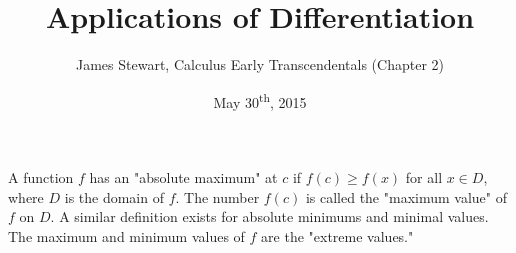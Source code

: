 \documentclass[a4paper,11pt]{article}
\title{Applications of Differentiation}
\author{James Stewart, Calculus Early Transcendentals (Chapter 2)}
\date{May 30\textsuperscript{th}, 2015}
\begin{document}
\maketitle
{}

\begin{outline}

    A function \(f\) has an "absolute maximum" at \(c\) if \(f(c) \geq f(x)\) for all \(x \in D\), where \(D\) is the
    domain of \(f\). The number \(f(c)\) is called the "maximum value" of \(f\) on \(D\). A similar definition exists
    for absolute minimums and minimal values. The maximum and minimum values of \(f\) are the "extreme values."

\end{outline}
\end{document}
